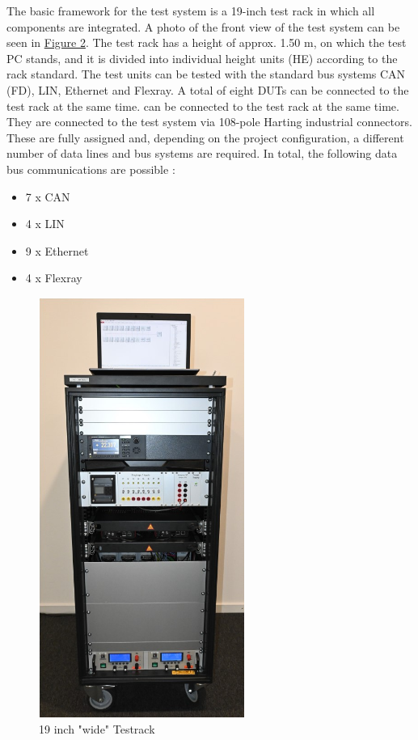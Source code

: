 The basic framework for the test system is a 19-inch test rack in which all components are integrated. A photo of the front view of the test system can be seen in \hyperref[fig:Testrack]{Figure 2}. The test rack has a height of approx. 1.50 m, on which the test PC stands, and it is divided into individual height units (HE) according to the rack standard. The test units can be tested with the standard bus systems CAN (FD), LIN, Ethernet and Flexray. A total of eight \gls{DUT}s can be connected to the test rack at the same time. can be connected to the test rack at the same time. They are connected to the test system via 108-pole Harting industrial connectors. These are fully assigned and, depending on the project configuration, a different number of data lines and bus systems are required. In total, the following data bus communications are possible :

\begin{itemize}
    \item 7 x CAN
    \item 4 x LIN
    \item 9 x Ethernet
    \item 4 x Flexray
\end{itemize}

\begin{figure}
  \centering
  \includegraphics[width= 0.6\textwidth]{images/Testrack.jpg}
  \caption{19 inch "wide" Testrack}
  \label{fig:Testrack}
\end{figure}

